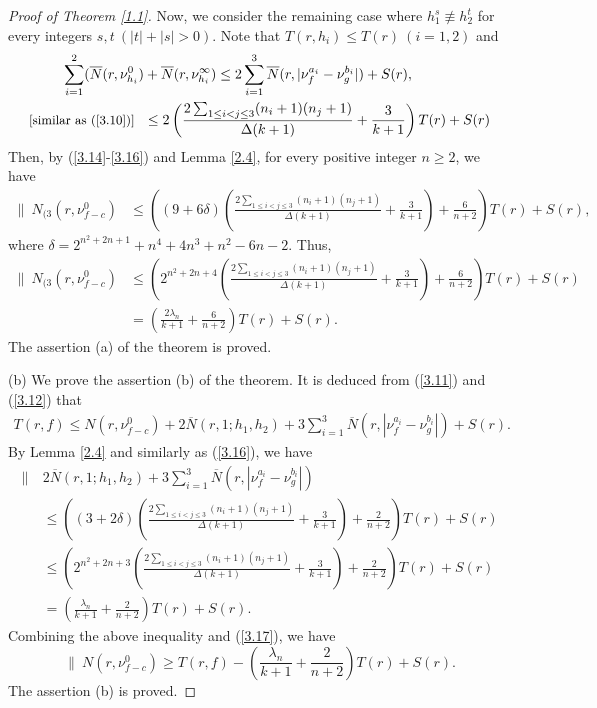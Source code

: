 \documentclass[12pt,leqno]{amsart}
\numberwithin{equation}{section}
\begin{document}
\begin{proof}[Proof of Theorem \ref{1.1}]
Now, we consider the remaining case where $h_1^{s}\not\equiv h_2^{t}$ for every integers $s,t\ (|t|+|s|>0)$. Note that $T(r,h_i)\le T(r)\ (i=1,2)$ and
\begin{align}\label{3.16}
\begin{split}
\sum_{i=1}^2(\overline N(r,\nu^0_{h_i})&+\overline N(r,\nu^\infty_{h_i})\le 2\sum_{i=1}^3\overline N(r,|\nu^{a_i}_f-\nu^{b_i}_g|)+S(r),\\ 
\text{\small{[similar as (\ref{3.10})]}}\ \ &\le 2\left(\frac{2\sum_{1\le i<j\le 3}(n_i+1)(n_j+1)}{\Delta(k+1)}+\frac{3}{k+1}\right)T(r)+S(r)\\
\end{split}
\end{align}
Then, by (\ref{3.14}-\ref{3.16}) and Lemma \ref{2.4}, for every positive integer $n\ge 2$, we have
\begin{align*}
\|\ N_{(3}\left(r,\nu^0_{f-c}\right)&\le\left((9+6\delta)\left(\frac{2\sum_{1\le i<j\le 3}(n_i+1)(n_j+1)}{\Delta(k+1)}+\frac{3}{k+1}\right)+\frac{6}{n+2}\right)T(r)+S(r),
\end{align*}
where $\delta=2^{n^2+2n+1}+n^4+4n^3+n^2-6n-2.$ Thus,
\begin{align*}
\|\ N_{(3}\left(r,\nu^0_{f-c}\right)&\le\left(2^{n^2+2n+4}\left(\frac{2\sum_{1\le i<j\le 3}(n_i+1)(n_j+1)}{\Delta(k+1)}+\frac{3}{k+1}\right)+\frac{6}{n+2}\right)T(r)+S(r)\\
&=\left(\frac{2\lambda_n}{k+1}+\frac{6}{n+2}\right)T(r)+S(r).
\end{align*}
The assertion (a) of the theorem is proved.

(b) We prove the assertion (b) of the theorem. It is deduced from (\ref{3.11}) and (\ref{3.12}) that
\begin{align}\label{3.17}
T(r,f)\le N\left(r,\nu^0_{f-c}\right)+2\overline N(r,1;h_1,h_2)+3\sum_{i=1}^3\overline N\left(r,|\nu^{a_i}_f-\nu^{b_i}_g|\right)+S(r).
\end{align}
By Lemma \ref{2.4} and similarly as (\ref{3.16}), we have
\begin{align*}
\|\ &2\overline N(r,1;h_1,h_2)+3\sum_{i=1}^3\overline N\left(r,|\nu^{a_i}_f-\nu^{b_i}_g|\right)\\
&\le\left((3+2\delta)\left(\frac{2\sum_{1\le i<j\le 3}(n_i+1)(n_j+1)}{\Delta(k+1)}+\frac{3}{k+1}\right)+\frac{2}{n+2}\right)T(r)+S(r)\\
&\le \left(2^{n^2+2n+3}\left(\frac{2\sum_{1\le i<j\le 3}(n_i+1)(n_j+1)}{\Delta(k+1)}+\frac{3}{k+1}\right)+\frac{2}{n+2}\right)T(r)+S(r)\\
&=\left(\frac{\lambda_n}{k+1}+\frac{2}{n+2}\right)T(r)+S(r).
\end{align*}
Combining the above inequality and (\ref{3.17}), we have
$$\|\ N\left(r,\nu^0_{f-c}\right)\ge T(r,f)-\left(\frac{\lambda_n}{k+1}+\frac{2}{n+2}\right)T(r)+S(r).$$
The assertion (b) is proved.
\end{proof}
\end{document}

